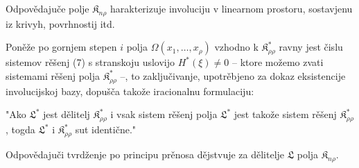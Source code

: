 \documentclass[11pt]{article}
\providecommand{\Kfield}{\mathfrak{K}}
\begin{document}
Odpovědajuče polje $\Kfield_{n\rho}$ harakterizuje involuciju v linearnom prostoru, sostavjenu iz krivyh, povrhnostij itd.

Poněže po gornjem stepen $i$ polja $\Omega(x_1,\ldots,x_\rho)$ vzhodno k $\Kfield^*_{\rho\rho}$ ravny jest čislu sistemov rěšenj (7) s stranskoju uslovijo $H^*(\xi)\ne0$ -- ktore možemo zvati sistemami rěšenj polja $\Kfield^*_{\rho\rho}$ --, to zaključivanje, upotrěbjeno za dokaz eksistencije involucijskoj bazy, dopušča takože iracionalnu formulaciju:

"Ako $\mathfrak{L}^*$ jest dělitelj $\Kfield^*_{\rho\rho}$ i vsak sistem rěšenj polja $\mathfrak{L}^*$ jest takože sistem rěšenj $\Kfield^*_{\rho\rho}$, togda $\mathfrak{L}^*$ i $\Kfield^*_{\rho\rho}$ sut identične."

Odpovědajuči tvrdženje po principu prěnosa dějstvuje za dělitelje $\mathfrak{L}$ polja $\Kfield_{n\rho}$.
\end{document}
